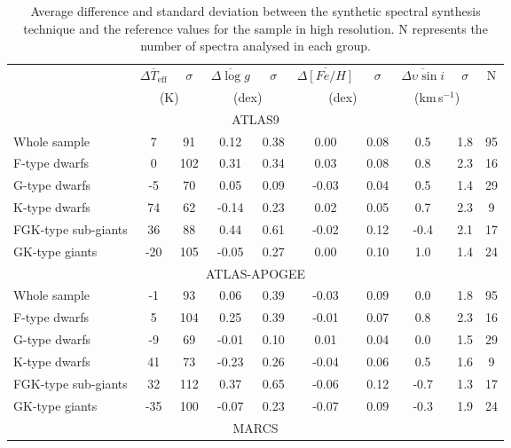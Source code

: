 \documentclass[fleqn,usenatbib]{mnras}
\begin{document}
\begin{table*}
\begin{center}
\caption{Average difference and standard deviation between the synthetic spectral synthesis technique and the reference values for the sample in high resolution. N represents the number 
of spectra analysed in each group.}
\label{results_table_high}
\begin{tabular}{lccccccccc}
\hline\hline
     & $\overline{\Delta T_{\mathrm{eff}}}$ & $\sigma$ & $\overline{\Delta \log g}$ & $\sigma$ & $\overline{\Delta [Fe/H]}$ & $\sigma$ & $\overline{\Delta \upsilon\sin i}$ & $\sigma$ & N \\
     & \multicolumn{2}{c}{(K)} & \multicolumn{2}{c}{ (dex)} & \multicolumn{2}{c}{ (dex)} & \multicolumn{2}{c}{ (km\,s$^{-1}$)} &  \\
\hline
\multicolumn{10}{c}{ATLAS9} \\
Whole sample         & 7   & 91  & 0.12  & 0.38 & 0.00  & 0.08 & 0.5  & 1.8 & 95 \\
F-type dwarfs        & 0   & 102 & 0.31  & 0.34 & 0.03  & 0.08 & 0.8  & 2.3 & 16 \\
G-type dwarfs        & -5  & 70  & 0.05  & 0.09 & -0.03 & 0.04 & 0.5  & 1.4 & 29 \\
K-type dwarfs        & 74  & 62  & -0.14 & 0.23 & 0.02  & 0.05 & 0.7  & 2.3 & 9  \\
FGK-type sub-giants  & 36  & 88  & 0.44  & 0.61 & -0.02 & 0.12 & -0.4 & 2.1 & 17 \\
GK-type giants       & -20 & 105 & -0.05 & 0.27 & 0.00  & 0.10 & 1.0  & 1.4 & 24 \\
\hline
\multicolumn{10}{c}{ATLAS-APOGEE} \\
Whole sample         & -1  & 93  & 0.06  & 0.39 & -0.03 & 0.09 & 0.0  & 1.8 & 95 \\
F-type dwarfs        & 5   & 104 & 0.25  & 0.39 & -0.01 & 0.07 & 0.8  & 2.3 & 16 \\
G-type dwarfs        & -9  & 69  & -0.01 & 0.10 & 0.01  & 0.04 & 0.0  & 1.5 & 29 \\
K-type dwarfs        & 41  & 73  & -0.23 & 0.26 & -0.04 & 0.06 & 0.5  & 1.6 & 9  \\
FGK-type sub-giants  & 32  & 112 & 0.37  & 0.65 & -0.06 & 0.12 & -0.7 & 1.3 & 17 \\
GK-type giants       & -35 & 100 & -0.07 & 0.23 & -0.07 & 0.09 & -0.3 & 1.9 & 24 \\
\hline
\multicolumn{10}{c}{MARCS} \\

\end{tabular}
\end{center}
\end{table*}
\end{document}
